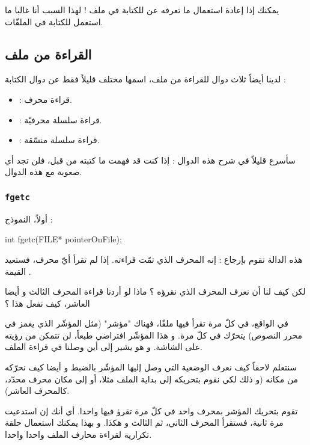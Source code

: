 
يمكنك إذا إعادة استعمال ما تعرفه عن
للكتابة في ملف ! لهذا السبب أنا غالبا ما استعمل
للكتابة في الملفّات.

\subsection{القراءة من ملف}
لدينا أيضاً ثلاث دوال للقراءة من ملف، اسمها مختلف قليلاً فقط عن دوال الكتابة :
\begin{itemize}
  \item {} :
 قراءة محرف.
  \item {} :
قراءة سلسلة محرفيّة.
  \item {} :
قراءة سلسلة منسّقة.
\end{itemize}

سأسرع قليلاً في شرح هذه الدوال : إذا كنت قد فهمت ما كتبته من قبل، فلن تجد أي صعوبة مع هذه الدوال.

\subsubsection{\texttt{fgetc}}
أولاً، النموذج :

\begin{Csource}
int fgetc(FILE* pointerOnFile);
\end{Csource}

هذه الدالة تقوم بإرجاع
 :
إنه المحرف الذي تمّت قراءته.
إذا لم تقرأ أيّ محرف، فستعيد القيمة
.

\begin{question}
لكن كيف لنا أن نعرف المحرف الذي نقرؤه ؟ ماذا لو أردنا قراءة المحرف الثالث و أيضا العاشر، كيف نفعل هذا ؟
\end{question}

في الواقع، في كلّ مرة تقرأ فيها ملفّا، فهناك "مؤشر" (مثل المؤشّر الذي يغمز في محرر النصوص) يتحرّك في كلّ مرة. و هذا المؤشّر افتراضي طبعاً، لن تتمكن من رؤيته على الشاشة. و هو يشير إلى أين وصلنا في قراءة الملف.

سنتعلم لاحقاً كيف نعرف الوضعية التي وصل إليها المؤشّر بالضبط و أيضا كيف نحرّكه من مكانه (و ذلك لكي نقوم بتحريكه إلى بداية الملف مثلا، أو إلى مكان محرف محدّد، كالمحرف العاشر).

تقوم بتحريك المؤشر بمحرف واحد في كلّ مرة تقرؤ فيها واحدا. أي أنك إن استدعيت
مرة ثانية، فستقرأ المحرف الثاني، ثم الثالث و هكذا. و بهذا يمكنك استعمال حلقة تكرارية لقراءة محارف الملف واحدا واحدا.

